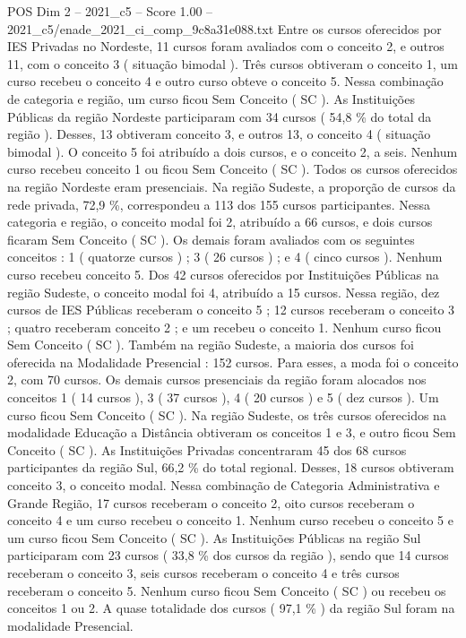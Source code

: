\begin{textsample}{POS Dim 2 – 2021\_c5 – Score 1.00 – 2021\_c5/enade\_2021\_ci\_comp\_9c8a31e088.txt}
Entre os cursos oferecidos por IES Privadas no Nordeste, 11 cursos foram avaliados com o conceito 2, e outros 11, com o conceito 3 ( situação bimodal ).
Três cursos obtiveram o conceito 1, um curso recebeu o conceito 4 e outro curso obteve o conceito 5.
Nessa combinação de categoria e região, um curso ficou Sem Conceito ( SC ).
As Instituições Públicas da região Nordeste participaram com 34 cursos ( 54,8 \% do total da região ).
Desses, 13 obtiveram conceito 3, e outros 13, o conceito 4 ( situação bimodal ).
O conceito 5 foi atribuído a dois cursos, e o conceito 2, a seis.
Nenhum curso recebeu conceito 1 ou ficou Sem Conceito ( SC ).
Todos os cursos oferecidos na região Nordeste eram presenciais.
Na região Sudeste, a proporção de cursos da rede privada, 72,9 \%, correspondeu a 113 dos 155 cursos participantes.
Nessa categoria e região, o conceito modal foi 2, atribuído a 66 cursos, e dois cursos ficaram Sem Conceito ( SC ).
Os demais foram avaliados com os seguintes conceitos : 1 ( quatorze cursos ) ; 3 ( 26 cursos ) ; e 4 ( cinco cursos ).
Nenhum curso recebeu conceito 5.
Dos 42 cursos oferecidos por Instituições Públicas na região Sudeste, o conceito modal foi 4, atribuído a 15 cursos.
Nessa região, dez cursos de IES Públicas receberam o conceito 5 ; 12 cursos receberam o conceito 3 ; quatro receberam conceito 2 ; e um recebeu o conceito 1.
Nenhum curso ficou Sem Conceito ( SC ).
Também na região Sudeste, a maioria dos cursos foi oferecida na Modalidade Presencial : 152 cursos.
Para esses, a moda foi o conceito 2, com 70 cursos.
Os demais cursos presenciais da região foram alocados nos conceitos 1 ( 14 cursos ), 3 ( 37 cursos ), 4 ( 20 cursos ) e 5 ( dez cursos ).
Um curso ficou Sem Conceito ( SC ).
Na região Sudeste, os três cursos oferecidos na modalidade Educação a Distância obtiveram os conceitos 1 e 3, e outro ficou Sem Conceito ( SC ).
As Instituições Privadas concentraram 45 dos 68 cursos participantes da região Sul, 66,2 \% do total regional.
Desses, 18 cursos obtiveram conceito 3, o conceito modal.
Nessa combinação de Categoria Administrativa e Grande Região, 17 cursos receberam o conceito 2, oito cursos receberam o conceito 4 e um curso recebeu o conceito 1.
Nenhum curso recebeu o conceito 5 e um curso ficou Sem Conceito ( SC ).
As Instituições Públicas na região Sul participaram com 23 cursos ( 33,8 \% dos cursos da região ), sendo que 14 cursos receberam o conceito 3, seis cursos receberam o conceito 4 e três cursos receberam o conceito 5.
Nenhum curso ficou Sem Conceito ( SC ) ou recebeu os conceitos 1 ou 2.
A quase totalidade dos cursos ( 97,1 \% ) da região Sul foram na modalidade Presencial.

\end{textsample}
